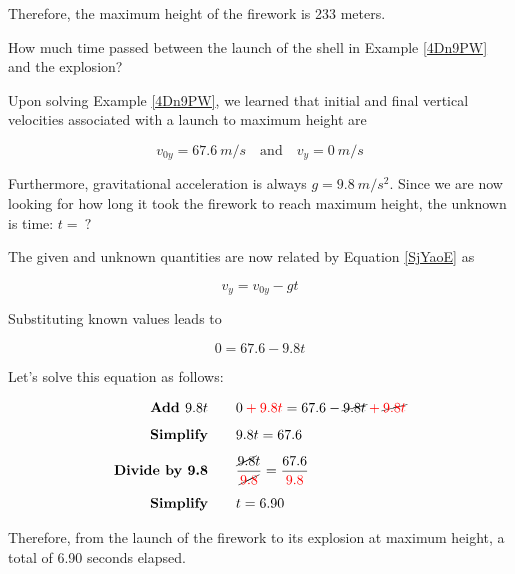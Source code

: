 \documentclass{article}
\begin{document}
Therefore, the maximum height of the firework is 233 meters.

\endsolution

\begin{example} \label{t57osh}
    How much time passed between the launch of the shell in Example \ref{4Dn9PW} and the explosion?
\end{example}

\Solution
Upon solving Example \ref{4Dn9PW}, we learned that initial and final vertical velocities associated with a launch to maximum height are

\begin{equation*}
    v_{0y} = \SI{67.6}{m/s} \quad \text{and} \quad v_y = \SI{0}{m/s}
\end{equation*}

Furthermore, gravitational acceleration is always $g = \SI{9.8}{m/s^2}$. Since we are now looking for how long it took the firework to reach maximum height, the unknown is time: $t =\ ?$

\vspace{1em}

The given and unknown quantities are now related by Equation \eqref{SjYaoE} as 

\begin{equation*}
    v_y = v_{0y} - gt
\end{equation*}

Substituting known values leads to

\begin{equation*}
    0 = 67.6 - 9.8 t
\end{equation*}

Let's solve this equation as follows:

\begin{align*}
    \textbf{Add $9.8 t$} \qquad & 0 \mathbin{\color{red} +} \textcolor{red}{9.8 t} = 67.6 - \cancel{9.8 t} \mathbin{\color{red} +} \cancel{\textcolor{red}{9.8 t}}\\[1ex]
    \textbf{Simplify} \qquad & 9.8 t = 67.6\\[1ex]
    \textbf{Divide by 9.8} \qquad & \frac{\cancel{9.8} t}{\cancel{\textcolor{red}{9.8}}} = \frac{67.6}{\textcolor{red}{9.8}}\\[1ex]
    \textbf{Simplify} \qquad & t = 6.90
\end{align*}

Therefore, from the launch of the firework to its explosion at maximum height, a total of 6.90 seconds elapsed.

\endsolution
\end{document}
